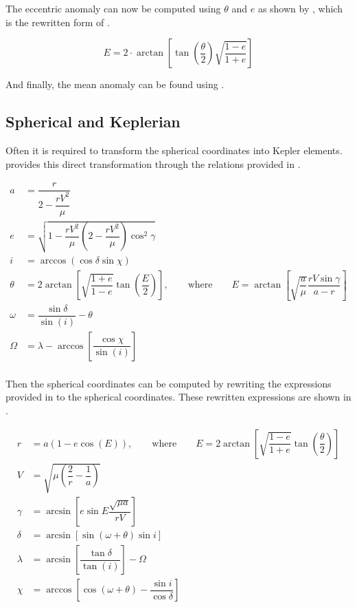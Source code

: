 \noindent
The eccentric anomaly can now be computed using $\theta$ and $e$ as shown by , which is the rewritten form of .

\begin{equation}\label{eq:ecc}
E=2\cdot\arctan\left[\tan\left(\dfrac{\theta}{2}\right)\sqrt{\dfrac{1-e}{1+e}}\right]
\end{equation}

\noindent
And finally, the mean anomaly can be found using \citep{noomen2013basic}.


\newpage
\subsection{Spherical and Keplerian}
\label{subsec:spherkepl}
Often it is required to transform the spherical coordinates into Kepler elements. \cite{wakker2010astro1} provides this direct transformation through the relations provided in . 


\begin{equation} \label{eq:sphertokepl}
\begin{split}
a&=\dfrac{r}{2-\dfrac{rV^{2}}{\mu}}\\
e&=\sqrt{1-\dfrac{rV^{2}}{\mu}\left(2-\dfrac{rV^{2}}{\mu}\right)\cos^{2}\gamma }\\
i&=\arccos\left(\cos\delta \sin\chi \right)\\
\theta&=2\arctan\left[\sqrt{\dfrac{1+e}{1-e}}\tan\left(\dfrac{E}{2}\right)\right], \qquad \text{where} \qquad E=\arctan\left[\sqrt{\dfrac{a}{\mu}}\dfrac{rV\sin\gamma }{a-r}\right] \\
\omega&=\dfrac{\sin\delta }{\sin\left(i\right)}-\theta\\
\Omega&=\lambda-\arccos\left[\dfrac{\cos\chi }{\sin\left(i\right)}\right]\\
\end{split}
\end{equation}   

\noindent
Then the spherical coordinates can be computed by rewriting the expressions provided in  to the spherical coordinates. These rewritten expressions are shown in . 

\begin{equation} \label{eq:kepltospher}
\begin{split}
r&= a\left(1-e\cos\left(E\right)\right), \qquad \text{where} \qquad E=2\arctan\left[\sqrt{\dfrac{1-e}{1+e}}\tan\left(\dfrac{\theta}{2}\right)\right]\\
V&=\sqrt{\mu\left(\dfrac{2}{r}-\dfrac{1}{a}\right)}\\
\gamma&=\arcsin\left[e\sin E\dfrac{\sqrt{\mu a}}{rV}\right]\\
\delta&=\arcsin\left[\sin\left(\omega+\theta\right)\sin i\right]\\
\lambda&=\arcsin\left[\dfrac{\tan\delta }{\tan\left(i\right)}\right]-\Omega\\
\chi&=\arccos\left[\cos\left(\omega+\theta\right)-\dfrac{\sin i}{\cos\delta }\right]\\
\end{split}
\end{equation} 


